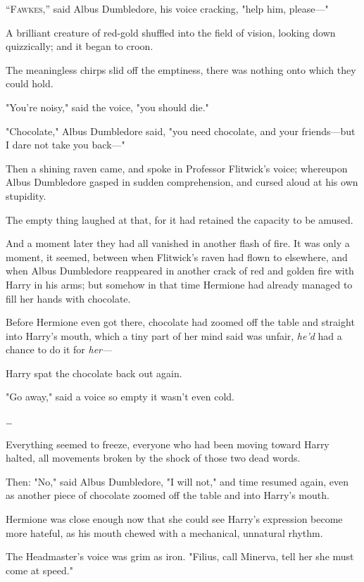 
\lettrine{“F}{awkes},” said
Albus Dumbledore, his voice cracking, "help him, please—"

A brilliant creature of red-gold shuffled into the field of vision, looking
down quizzically; and it began to croon.

The meaningless chirps slid off the emptiness, there was nothing onto which
they could hold.

"You’re noisy," said the voice, "you should die."

"Chocolate," Albus Dumbledore said, "you need chocolate, and your friends—but
I dare not take you back—"

Then a shining raven came, and spoke in Professor Flitwick’s voice; whereupon
Albus Dumbledore gasped in sudden comprehension, and cursed aloud at his own
stupidity.

The empty thing laughed at that, for it had retained the capacity to be amused.

And a moment later they had all vanished in another flash of fire.
\later
It was only a moment, it seemed, between when Flitwick’s raven had flown to
elsewhere, and when Albus Dumbledore reappeared in another crack of red and
golden fire with Harry in his arms; but somehow in that time Hermione had
already managed to fill her hands with chocolate.

Before Hermione even got there, chocolate had zoomed off the table and straight
into Harry’s mouth, which a tiny part of her mind said was unfair, \emph{he’d}
had a chance to do it for \emph{her—}

Harry spat the chocolate back out again.

"Go away," said a voice so empty it wasn’t even cold.

…

Everything seemed to freeze, everyone who had been moving toward Harry halted,
all movements broken by the shock of those two dead words.

Then: "No," said Albus Dumbledore, "I will not," and time resumed again, even
as another piece of chocolate zoomed off the table and into Harry’s mouth.

Hermione was close enough now that she could see Harry’s expression become more
hateful, as his mouth chewed with a mechanical, unnatural rhythm.

The Headmaster’s voice was grim as iron. "Filius, call Minerva, tell her she
must come at speed."

